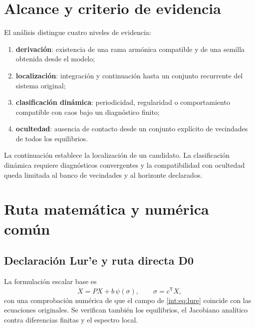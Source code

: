 \section{Alcance y criterio de evidencia}

El análisis distingue cuatro niveles de evidencia:

\begin{enumerate}
  \item \textbf{derivación}: existencia de una rama armónica compatible y de
        una semilla obtenida desde el modelo;
  \item \textbf{localización}: integración y continuación hasta un conjunto
        recurrente del sistema original;
  \item \textbf{clasificación dinámica}: periodicidad, regularidad o
        comportamiento compatible con caos bajo un diagnóstico finito;
  \item \textbf{ocultedad}: ausencia de contacto desde un conjunto explícito
        de vecindades de todos los equilibrios.
\end{enumerate}

La continuación establece la localización de un candidato. La clasificación
dinámica requiere diagnósticos convergentes y la compatibilidad con ocultedad
queda limitada al banco de vecindades y al horizonte declarados.


\section{Ruta matemática y numérica común}

\subsection{Declaración Lur'e y ruta directa D0}

La formulación escalar base es
\begin{equation}
  \dot X=PX+b\,\psi(\sigma),\qquad
  \sigma=c^{\mathsf T}X,
  \label{int:eq:lure}
\end{equation}
con una comprobación numérica de que el campo de \eqref{int:eq:lure} coincide con
las ecuaciones originales. Se verifican también los equilibrios, el Jacobiano
analítico contra diferencias finitas y el espectro local.

